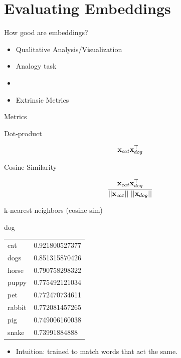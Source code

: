 \documentclass{beamer}
\begin{document}
\section{Evaluating Embeddings}

\begin{frame}{How good are embeddings?}
  \begin{itemize}
  \item Qualitative Analysis/Visualization
    \air
  \item Analogy task
    \air
  \item
    \air
  \item Extrinsic Metrics

  \end{itemize}
\end{frame}

\begin{frame}{Metrics}

  Dot-product

  \[\mathbf{x}_{cat} \mathbf{x}_{dog}^{\top}\]

  Cosine Similarity

  \[\frac{\mathbf{x}_{cat} \mathbf{x}_{dog}^{\top}}{||\mathbf{x}_{cat} ||\ || \mathbf{x}_{dog}||  }\]

\end{frame}

\begin{frame}{k-nearest neighbors (cosine sim)}
  \begin{center}
    dog
    \begin{tabular}{ll}
      cat &  0.921800527377\\
      dogs & 0.851315870426 \\
      horse & 0.790758298322 \\
      puppy & 0.775492121034 \\
      pet & 0.772470734611 \\
      rabbit& 0.772081457265 \\
      pig& 0.749006160038 \\
      snake & 0.73991884888 \\
    \end{tabular}
  \end{center}

  \begin{itemize}
  \item Intuition: trained to match words that act the same.
  \end{itemize}
\end{frame}
\end{document}
